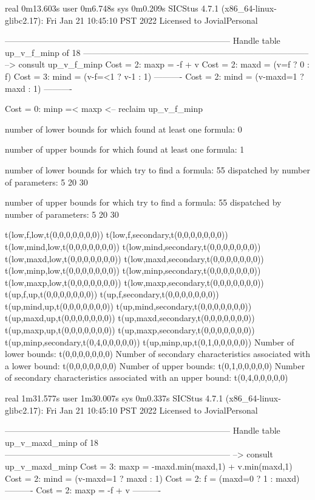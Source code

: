 real	0m13.603s
user	0m6.748s
sys	0m0.209s
SICStus 4.7.1 (x86_64-linux-glibc2.17): Fri Jan 21 10:45:10 PST 2022
Licensed to JovialPersonal


--------------------------------------------------------------------------------
Handle table up_v_f_minp of 18
--------------------------------------------------------------------------------
--> consult up_v_f_minp
Cost =  2:  maxp = -f + v
Cost =  2:  maxd = (v=f ? 0 : f)
Cost =  3:  mind = (v-f=<1 ? v-1 : 1)
----------
Cost =  2:  mind = (v-maxd=1 ? maxd : 1)
----------

Cost =  0:  minp =< maxp
<-- reclaim up_v_f_minp

number of lower bounds for which found at least one formula: 0

number of upper bounds for which found at least one formula: 1

number of lower bounds for which try to find a formula: 55
dispatched by number of parameters: 5  20  30

number of upper bounds for which try to find a formula: 55
dispatched by number of parameters: 5  20  30

t(low,f,low,t(0,0,0,0,0,0,0))
t(low,f,secondary,t(0,0,0,0,0,0,0))
t(low,mind,low,t(0,0,0,0,0,0,0))
t(low,mind,secondary,t(0,0,0,0,0,0,0))
t(low,maxd,low,t(0,0,0,0,0,0,0))
t(low,maxd,secondary,t(0,0,0,0,0,0,0))
t(low,minp,low,t(0,0,0,0,0,0,0))
t(low,minp,secondary,t(0,0,0,0,0,0,0))
t(low,maxp,low,t(0,0,0,0,0,0,0))
t(low,maxp,secondary,t(0,0,0,0,0,0,0))
t(up,f,up,t(0,0,0,0,0,0,0))
t(up,f,secondary,t(0,0,0,0,0,0,0))
t(up,mind,up,t(0,0,0,0,0,0,0))
t(up,mind,secondary,t(0,0,0,0,0,0,0))
t(up,maxd,up,t(0,0,0,0,0,0,0))
t(up,maxd,secondary,t(0,0,0,0,0,0,0))
t(up,maxp,up,t(0,0,0,0,0,0,0))
t(up,maxp,secondary,t(0,0,0,0,0,0,0))
t(up,minp,secondary,t(0,4,0,0,0,0,0))
t(up,minp,up,t(0,1,0,0,0,0,0))
Number of lower bounds:                                             t(0,0,0,0,0,0,0)
Number of secondary characteristics associated with a lower bound:  t(0,0,0,0,0,0,0)
Number of upper bounds:                                             t(0,1,0,0,0,0,0)
Number of secondary characteristics associated with an upper bound: t(0,4,0,0,0,0,0)

real	1m31.577s
user	1m30.007s
sys	0m0.337s
SICStus 4.7.1 (x86_64-linux-glibc2.17): Fri Jan 21 10:45:10 PST 2022
Licensed to JovialPersonal


--------------------------------------------------------------------------------
Handle table up_v_maxd_minp of 18
--------------------------------------------------------------------------------
--> consult up_v_maxd_minp
Cost =  3:  maxp = -maxd.min(maxd,1) + v.min(maxd,1)
Cost =  2:  mind = (v-maxd=1 ? maxd : 1)
Cost =  2:  f    = (maxd=0 ? 1 : maxd)
----------
Cost =  2:  maxp = -f + v
----------

